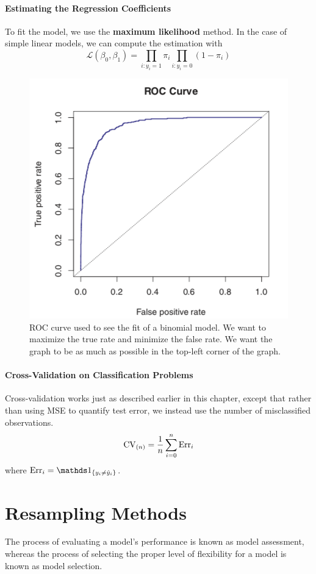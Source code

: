 \paragraph{Estimating the Regression Coefficients}
To fit the model, we use the \textbf{maximum likelihood} method. In the case of simple linear models, we can compute the estimation with
\[ \mathcal{L}(\beta_0, \beta_1) = \prod_{i:y_i=1} \pi_i \prod_{i:y_i=0} (1 - \pi_i) \]
\newpage

\begin{figure}[!ht]
    \centering
    \includegraphics[scale=0.7]{src/StatisticalLearning/ROC-Curve.png}
    \caption{ROC curve used to see the fit of a binomial model. We want to maximize the true rate and minimize the false rate. We want the graph to be as much as possible in the top-left corner of the graph.}
\end{figure}


\paragraph{Cross-Validation on Classification Problems}
Cross-validation works just as described earlier in this chapter, except that rather than using MSE to quantify test error, we instead use the number of misclassified observations.
\[ \mathrm{CV}_{(n)} = \frac{1}{n} \sum_{i=0}^n \mathrm{Err}_i\]
where $\mathrm{Err}_i = \indic{y_i \neq \hat{y}_i}$.

\section{Resampling Methods}
The process of evaluating a model’s performance is known as model assessment, whereas the process of selecting the proper level of flexibility for a model is known as model selection.

